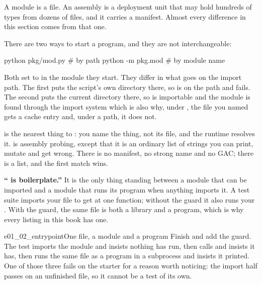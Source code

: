 \noindent
A module is a file. An assembly is a deployment unit that may hold hundreds
of types from dozens of files, and it carries a manifest. Almost every
difference in this section comes from that one.

There are two ways to start a program, and they are not interchangeable:

\begin{shellcmd}
python pkg/mod.py     # by path
python -m pkg.mod     # by module name
\end{shellcmd}

\noindent
Both set  to  in the module they
start. They differ in what goes on the import path. The first puts the
script's own directory there, so  is on the path and
 fails. The second puts the current directory there, so
 is importable and the module is found through the import system
\dash{} which is also why, under , the file you named gets a cache
entry and, under a path, it does not.

\begin{csbox}
 is the nearest thing to : you name
the thing, not its file, and the runtime resolves it.  is
assembly probing, except that it is an ordinary list of strings you can
print, mutate and get wrong. There is no manifest, no strong name and no
GAC; there is a list, and the first match wins.
\end{csbox}

\begin{trapbox}
\textbf{\enquote{ is boilerplate.}}
It is the only thing standing between a module that can be imported and a
module that runs its program when anything imports it. A test suite imports
your file to get at one function; without the guard it also runs your
. With the guard, the same file is both a library and a program,
which is why every listing in this book has one.
\end{trapbox}

\begin{exercise}{e01_02_entrypoint}{One file, a module and a program}
Finish  and add the guard. The test imports the module and
insists nothing has run, then calls  and insists it has, then
runs the same file as a program in a subprocess and insists it printed. One
of those three fails on the starter for a reason worth noticing: the import
half passes on an unfinished file, so it cannot be a test of its own.
\end{exercise}

